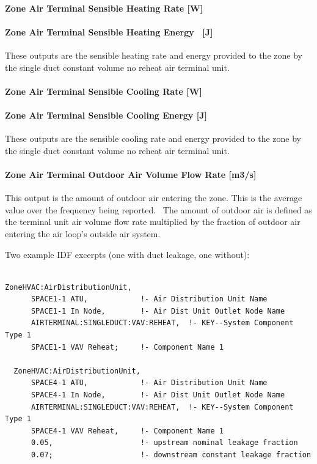 \paragraph{Zone Air Terminal Sensible Heating Rate {[}W{]}}\label{zone-air-terminal-sensible-heating-rate-w}

\paragraph{Zone Air Terminal Sensible Heating Energy~ {[}J{]}}\label{zone-air-terminal-sensible-heating-energy-j}

These outputs are the sensible heating rate and energy provided to the zone by the single duct constant volume no reheat air terminal unit.

\paragraph{Zone Air Terminal Sensible Cooling Rate {[}W{]}}\label{zone-air-terminal-sensible-cooling-rate-w}

\paragraph{Zone Air Terminal Sensible Cooling Energy {[}J{]}}\label{zone-air-terminal-sensible-cooling-energy-j}

These outputs are the sensible cooling rate and energy provided to the zone by the single duct constant volume no reheat air terminal unit.

\paragraph{Zone Air Terminal Outdoor Air Volume Flow Rate {[}m3/s{]}}

This output is the amount of outdoor air entering the zone. This is the average value over the frequency being reported.~ The amount of outdoor air is defined as the terminal unit air volume flow rate multiplied by the fraction of outdoor air entering the air loop's outside air system.

Two example IDF excerpts (one with duct leakage, one without):

\begin{lstlisting}

ZoneHVAC:AirDistributionUnit,
      SPACE1-1 ATU,            !- Air Distribution Unit Name
      SPACE1-1 In Node,        !- Air Dist Unit Outlet Node Name
      AIRTERMINAL:SINGLEDUCT:VAV:REHEAT,  !- KEY--System Component Type 1
      SPACE1-1 VAV Reheat;     !- Component Name 1

  ZoneHVAC:AirDistributionUnit,
      SPACE4-1 ATU,            !- Air Distribution Unit Name
      SPACE4-1 In Node,        !- Air Dist Unit Outlet Node Name
      AIRTERMINAL:SINGLEDUCT:VAV:REHEAT,  !- KEY--System Component Type 1
      SPACE4-1 VAV Reheat,     !- Component Name 1
      0.05,                    !- upstream nominal leakage fraction
      0.07;                    !- downstream constant leakage fraction
\end{lstlisting}

